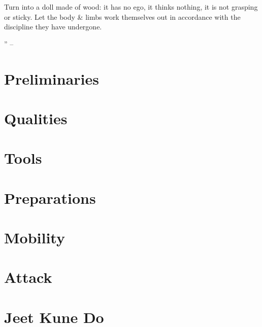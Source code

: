 \documentclass[oneside]{book}
\numberwithin{equation}{section}
\begin{document}
Turn into a doll made of wood: it has no ego, it thinks nothing, it is not grasping or sticky. Let the body \& limbs work themselves out in accordance with the discipline they have undergone.

'' -- \cite[pp. 12 --]{Lee2011}


\section{Preliminaries}


\section{Qualities}


\section{Tools}


\section{Preparations}


\section{Mobility}


\section{Attack}


\section{Jeet Kune Do}
\end{document}
